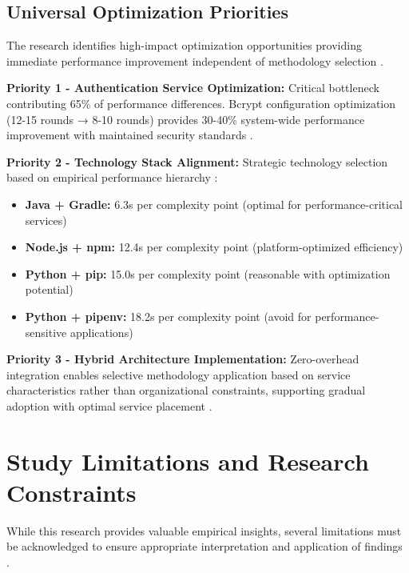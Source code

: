 \subsection{Universal Optimization Priorities}
\label{subsec:optimization_priorities}

The research identifies high-impact optimization opportunities providing immediate performance improvement independent of methodology selection \cite{performance_optimization,universal_improvements}.

\textbf{Priority 1 - Authentication Service Optimization:}
Critical bottleneck contributing 65\% of performance differences. Bcrypt configuration optimization (12-15 rounds → 8-10 rounds) provides 30-40\% system-wide performance improvement with maintained security standards \cite{bcrypt_optimization,authentication_performance}.

\textbf{Priority 2 - Technology Stack Alignment:}
Strategic technology selection based on empirical performance hierarchy \cite{technology_selection,performance_benchmarking}:
\begin{itemize}
\item \textbf{Java + Gradle:} 6.3s per complexity point (optimal for performance-critical services) \cite{java_gradle_performance}
\item \textbf{Node.js + npm:} 12.4s per complexity point (platform-optimized efficiency) \cite{nodejs_performance}
\item \textbf{Python + pip:} 15.0s per complexity point (reasonable with optimization potential) \cite{python_performance}
\item \textbf{Python + pipenv:} 18.2s per complexity point (avoid for performance-sensitive applications) \cite{pipenv_overhead}
\end{itemize}

\textbf{Priority 3 - Hybrid Architecture Implementation:}
Zero-overhead integration enables selective methodology application based on service characteristics rather than organizational constraints, supporting gradual adoption with optimal service placement \cite{hybrid_implementation,selective_adoption}.

\section{Study Limitations and Research Constraints}
\label{sec:study_limitations}

While this research provides valuable empirical insights, several limitations must be acknowledged to ensure appropriate interpretation and application of findings \cite{research_limitations,empirical_study_constraints}.


